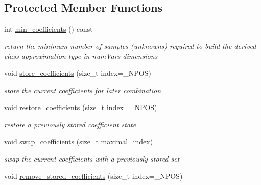 \subsection*{Protected Member Functions}
\begin{DoxyCompactItemize}
\item 
int \hyperlink{classPecos_1_1OrthogPolyApproximation_ac789358ee49633613d6c97593be06f9d}{min\+\_\+coefficients} () const \label{classPecos_1_1OrthogPolyApproximation_ac789358ee49633613d6c97593be06f9d}

\begin{DoxyCompactList}\small\item\em return the minimum number of samples (unknowns) required to build the derived class approximation type in num\+Vars dimensions \end{DoxyCompactList}\item 
void \hyperlink{classPecos_1_1OrthogPolyApproximation_abc17a7104c33d8146f4a0ee7b6c6f37a}{store\+\_\+coefficients} (size\+\_\+t index=\+\_\+\+N\+P\+OS)\label{classPecos_1_1OrthogPolyApproximation_abc17a7104c33d8146f4a0ee7b6c6f37a}

\begin{DoxyCompactList}\small\item\em store the current coefficients for later combination \end{DoxyCompactList}\item 
void \hyperlink{classPecos_1_1OrthogPolyApproximation_ad05b093ee96314c9e05bad8e06c2dae7}{restore\+\_\+coefficients} (size\+\_\+t index=\+\_\+\+N\+P\+OS)\label{classPecos_1_1OrthogPolyApproximation_ad05b093ee96314c9e05bad8e06c2dae7}

\begin{DoxyCompactList}\small\item\em restore a previously stored coefficient state \end{DoxyCompactList}\item 
void \hyperlink{classPecos_1_1OrthogPolyApproximation_a859795ba714d81e821bec254479135ee}{swap\+\_\+coefficients} (size\+\_\+t maximal\+\_\+index)\label{classPecos_1_1OrthogPolyApproximation_a859795ba714d81e821bec254479135ee}

\begin{DoxyCompactList}\small\item\em swap the current coefficients with a previously stored set \end{DoxyCompactList}\item 
void \hyperlink{classPecos_1_1OrthogPolyApproximation_a63d12cc6021fda4896b8738d72dfcc86}{remove\+\_\+stored\+\_\+coefficients} (size\+\_\+t index=\+\_\+\+N\+P\+OS)\label{classPecos_1_1OrthogPolyApproximation_a63d12cc6021fda4896b8738d72dfcc86}


\end{DoxyCompactItemize}

